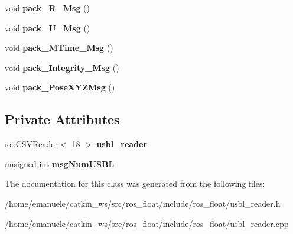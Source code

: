 \begin{DoxyCompactItemize}
\item 
\mbox{\label{classUSBL__reader_a072218abbd50b9aa9134461a0f4ba9db}} 
void {\bfseries pack\+\_\+\+R\+\_\+\+Msg} ()
\item 
\mbox{\label{classUSBL__reader_abcfef373d8b093536d49690834f3a7de}} 
void {\bfseries pack\+\_\+\+U\+\_\+\+Msg} ()
\item 
\mbox{\label{classUSBL__reader_a2f618419b912f70c2096913d0b62240f}} 
void {\bfseries pack\+\_\+\+M\+Time\+\_\+\+Msg} ()
\item 
\mbox{\label{classUSBL__reader_a330c1291d48f63a51783d2ae267a978c}} 
void {\bfseries pack\+\_\+\+Integrity\+\_\+\+Msg} ()
\item 
\mbox{\label{classUSBL__reader_af0185260630e4c3d481756a377cf7be3}} 
void {\bfseries pack\+\_\+\+Pose\+X\+Y\+Z\+Msg} ()
\end{DoxyCompactItemize}
\subsection*{Private Attributes}
\begin{DoxyCompactItemize}
\item 
\mbox{\label{classUSBL__reader_ac056a1565b4bbeff68c2d73cbf6bf779}} 
\hyperlink{classio_1_1CSVReader}{io\+::\+C\+S\+V\+Reader}$<$ 18 $>$ {\bfseries usbl\+\_\+reader}
\item 
\mbox{\label{classUSBL__reader_ae0c08bafc82e04fdd11757b2250d3075}} 
unsigned int {\bfseries msg\+Num\+U\+S\+BL}
\end{DoxyCompactItemize}


The documentation for this class was generated from the following files\+:\begin{DoxyCompactItemize}
\item 
/home/emanuele/catkin\+\_\+ws/src/ros\+\_\+float/include/ros\+\_\+float/usbl\+\_\+reader.\+h\item 
/home/emanuele/catkin\+\_\+ws/src/ros\+\_\+float/include/ros\+\_\+float/usbl\+\_\+reader.\+cpp\end{DoxyCompactItemize}

